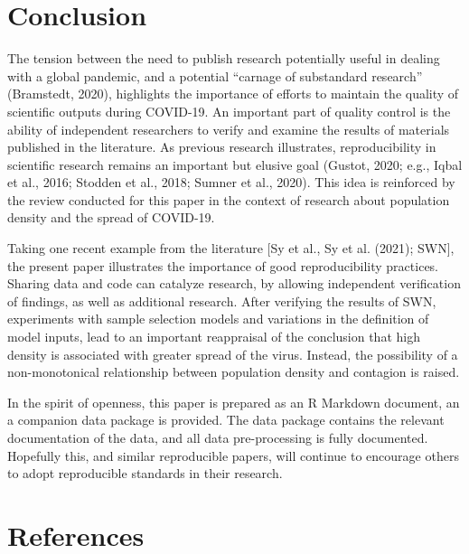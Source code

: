 \documentclass[]{elsarticle} %
\begin{document}
\hypertarget{conclusion}{%
\section{Conclusion}\label{conclusion}}

The tension between the need to publish research potentially useful in
dealing with a global pandemic, and a potential ``carnage of substandard
research'' (Bramstedt, 2020), highlights the importance of efforts to
maintain the quality of scientific outputs during COVID-19. An important
part of quality control is the ability of independent researchers to
verify and examine the results of materials published in the literature.
As previous research illustrates, reproducibility in scientific research
remains an important but elusive goal (Gustot, 2020; e.g., Iqbal et al.,
2016; Stodden et al., 2018; Sumner et al., 2020). This idea is
reinforced by the review conducted for this paper in the context of
research about population density and the spread of COVID-19.

Taking one recent example from the literature {[}Sy et al., Sy et al.
(2021); SWN{]}, the present paper illustrates the importance of good
reproducibility practices. Sharing data and code can catalyze research,
by allowing independent verification of findings, as well as additional
research. After verifying the results of SWN, experiments with sample
selection models and variations in the definition of model inputs, lead
to an important reappraisal of the conclusion that high density is
associated with greater spread of the virus. Instead, the possibility of
a non-monotonical relationship between population density and contagion
is raised.

In the spirit of openness, this paper is prepared as an R Markdown
document, an a companion data package is provided. The data package
contains the relevant documentation of the data, and all data
pre-processing is fully documented. Hopefully this, and similar
reproducible papers, will continue to encourage others to adopt
reproducible standards in their research.

\hypertarget{references}{%
\section*{References}\label{references}}
\end{document}
